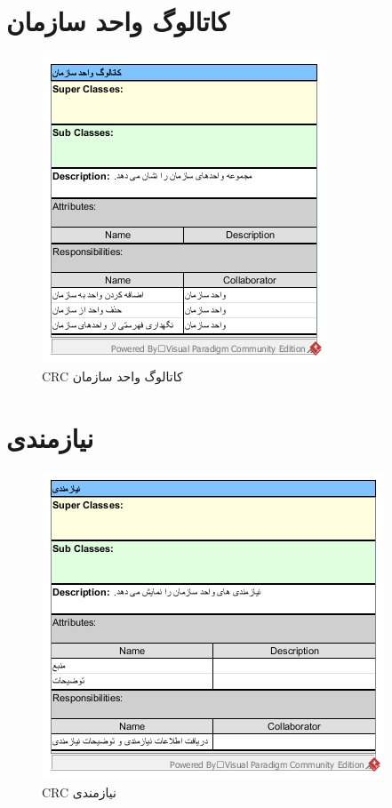 \section{کاتالوگ واحد سازمان}
\begin{figure}[H]
	\centering
	\includegraphics[scale=1]{img/crc/UnitCatalogue}
	\caption{CRC کاتالوگ واحد سازمان }
\end{figure}

\section{نیازمندی}
\begin{figure}[H]
	\centering
	\includegraphics[scale=1]{img/crc/Requirement}
	\caption{CRC نیازمندی }
\end{figure}
